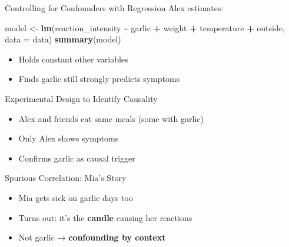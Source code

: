 \documentclass[
  ignorenonframetext,
]{beamer}
\newenvironment{Shaded}{\begin{snugshade}}{\end{snugshade}}
\newcommand{\AttributeTok}[1]{\textcolor[rgb]{0.13,0.29,0.53}{#1}}
\newcommand{\FunctionTok}[1]{\textcolor[rgb]{0.13,0.29,0.53}{\textbf{#1}}}
\newcommand{\NormalTok}[1]{#1}
\newcommand{\OtherTok}[1]{\textcolor[rgb]{0.56,0.35,0.01}{#1}}
\newcommand{\SpecialCharTok}[1]{\textcolor[rgb]{0.81,0.36,0.00}{\textbf{#1}}}
\providecommand{\tightlist}{%
  \setlength{\itemsep}{0pt}\setlength{\parskip}{0pt}}
\begin{document}
\begin{frame}[fragile]{Controlling for Confounders with Regression}
\protect\hypertarget{controlling-for-confounders-with-regression}{}
Alex estimates:

\begin{Shaded}
\begin{Highlighting}[]
\NormalTok{model }\OtherTok{\textless{}{-}} \FunctionTok{lm}\NormalTok{(reaction\_intensity }\SpecialCharTok{\textasciitilde{}}\NormalTok{ garlic }\SpecialCharTok{+}\NormalTok{ weight }\SpecialCharTok{+}\NormalTok{ temperature }\SpecialCharTok{+}\NormalTok{ outside, }\AttributeTok{data =}\NormalTok{ data)}
\FunctionTok{summary}\NormalTok{(model)}
\end{Highlighting}
\end{Shaded}

\begin{itemize}
\tightlist
\item
  Holds constant other variables
\item
  Finds garlic still strongly predicts symptoms
\end{itemize}

\end{frame}

\begin{frame}{Experimental Design to Identify Causality}
\protect\hypertarget{experimental-design-to-identify-causality}{}
\begin{itemize}
\tightlist
\item
  Alex and friends eat same meals (some with garlic)
\item
  Only Alex shows symptoms
\item
  Confirms garlic as causal trigger
\end{itemize}

\end{frame}

\begin{frame}{Spurious Correlation: Mia's Story}
\protect\hypertarget{spurious-correlation-mias-story}{}
\begin{itemize}
\tightlist
\item
  Mia gets sick on garlic days too
\item
  Turns out: it's the \textbf{candle} causing her reactions
\item
  Not garlic → \textbf{confounding by context}
\end{itemize}

\end{frame}
\end{document}

